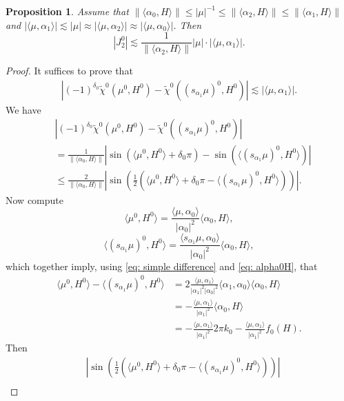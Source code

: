 \documentclass{amsart}
\numberwithin{equation}{section}
\newtheorem{prop}[thm]{Proposition}
\numberwithin{equation}{section}
\begin{document}
    \begin{prop}\label{prop: J2}
    Assume that $\|\langle\alpha_0, H\rangle\|\leq|\mu|^{-1}\leq  \|\langle\alpha_2, H\rangle\|\leq \|\langle\alpha_1, H\rangle\|$ and $| \langle\mu,\alpha_1\rangle|\lesssim |\mu|\approx |\langle\mu,\alpha_2\rangle|\approx |\langle\mu,\alpha_0\rangle|$. Then 
        $$|J^0_2|\lesssim \frac{1}{\|\langle\alpha_2, H\rangle\|}|\mu|\cdot |\langle \mu, \alpha_1  \rangle|.$$
    \end{prop}
    \begin{proof}
        It suffices to prove that 
        \begin{align}\label{eq: proving J2}
            \left|(-1)^{\delta_0}\widetilde{\chi}^0({\mu^0}, H^0)-\widetilde{\chi}^0({(s_{\alpha_1}\mu)^0}, H^0)\right|
            \lesssim |\langle\mu,\alpha_1\rangle|.
        \end{align}
We have 
\begin{align*}
 &\left|(-1)^{\delta_0}\widetilde{\chi}^0({\mu^0}, H^0)-\widetilde{\chi}^0({(s_{\alpha_1}\mu)^0}, H^0)\right|\\
 &=\frac1{\|\langle\alpha_0,H\rangle\|}\left|\sin(\langle\mu^0,H^0\rangle+{\delta_0}\pi)-\sin(\langle (s_{\alpha_1}\mu)^0,H^0\rangle)\right|\\
 &\leq \frac2{\|\langle\alpha_0,H\rangle\|}\left|\sin\left(\frac12(\langle\mu^0,H^0\rangle+{\delta_0}\pi-\langle (s_{\alpha_1}\mu)^0,H^0\rangle)\right)\right|.
\end{align*}
Now compute
$$\langle\mu^0,H^0\rangle=\frac{\langle\mu,\alpha_0\rangle}{|\alpha_0|^2}\langle\alpha_0,H\rangle,$$
$$\langle (s_{\alpha_1}\mu)^0,H^0\rangle =\frac{\langle s_{\alpha_1}\mu,\alpha_0\rangle}{|\alpha_0|^2}\langle\alpha_0,H\rangle,$$
which together imply, using \eqref{eq: simple difference} and \eqref{eq: alpha0H}, that  
\begin{align*}
    \langle\mu^0,H^0\rangle-\langle (s_{\alpha_1}\mu)^0,H^0\rangle &=
2\frac{\langle\mu,\alpha_1\rangle}{|\alpha_1|^2|\alpha_0|^2}\langle\alpha_1,\alpha_0\rangle\langle\alpha_0,H\rangle\\
&=-\frac{\langle\mu,\alpha_1\rangle}{|\alpha_1|^2}\langle\alpha_0,H\rangle\\
&=-\frac{\langle\mu,\alpha_1\rangle}{|\alpha_1|^2}2\pi k_0-\frac{\langle\mu,\alpha_1\rangle}{|\alpha_1|^2}f_0(H).
\end{align*}
Then 
\begin{align*}
   &\left|\sin\left(\frac12(\langle\mu^0,H^0\rangle+{\delta_0}\pi-\langle (s_{\alpha_1}\mu)^0,H^0\rangle)\right)\right|\\

\end{align*}
\end{proof}
\end{document}
